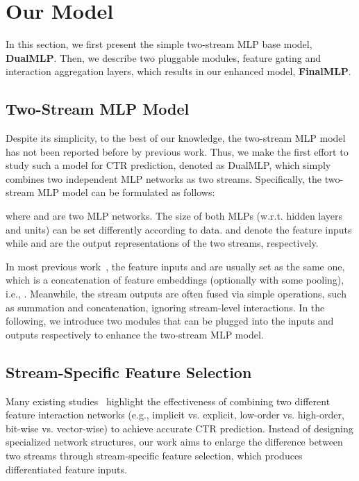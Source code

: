 \documentclass[letterpaper]{article} \usepackage{aaai23}  \usepackage{times}  \usepackage{helvet}  \usepackage{courier}  \usepackage[hyphens]{url}  \usepackage{graphicx} \urlstyle{rm} \def\UrlFont{\rm}  \usepackage{natbib}  \usepackage{caption} \frenchspacing  \setlength{\pdfpagewidth}{8.5in}  \setlength{\pdfpageheight}{11in}  \usepackage{algorithm}
\begin{document}
 \section{Our Model}

In this section, we first present the simple two-stream MLP base model, \textbf{DualMLP}. Then, we describe two pluggable modules, feature gating and interaction aggregation layers, which results in our enhanced model, \textbf{FinalMLP}.




\subsection{Two-Stream MLP Model}
Despite its simplicity, to the best of our knowledge, the two-stream MLP model  has not been reported before by previous work. Thus, we make the first effort to study such a model for CTR prediction, denoted as DualMLP, which simply combines two independent MLP networks as two streams. Specifically, the two-stream MLP model can be formulated as follows:

where  and  are two MLP networks. The size of both MLPs (w.r.t. hidden layers and units) can be set differently according to data.  and  denote the feature inputs while  and  are the output representations of the two streams, respectively. 

In most previous work~\cite{DCN,DeepFM,AFN}, the feature inputs  and  are usually set as the same one, which is a concatenation of feature embeddings  (optionally with some pooling), i.e., . Meanwhile, the stream outputs are often fused via simple operations, such as summation and concatenation, ignoring stream-level interactions. In the following, we introduce two modules that can be plugged into the inputs and outputs respectively to enhance the two-stream MLP model. 


\subsection{Stream-Specific Feature Selection}
\label{sec:input_differentiation}
Many existing studies~\cite{DeepFM,xDeepFM,DCN,autoint}
highlight the effectiveness of combining two different feature interaction networks (e.g., implicit vs. explicit, low-order vs. high-order, bit-wise vs. vector-wise) to achieve accurate CTR prediction. Instead of designing specialized network structures, our work aims to enlarge the difference between two streams through stream-specific feature selection, which produces differentiated feature inputs. 
\end{document}
